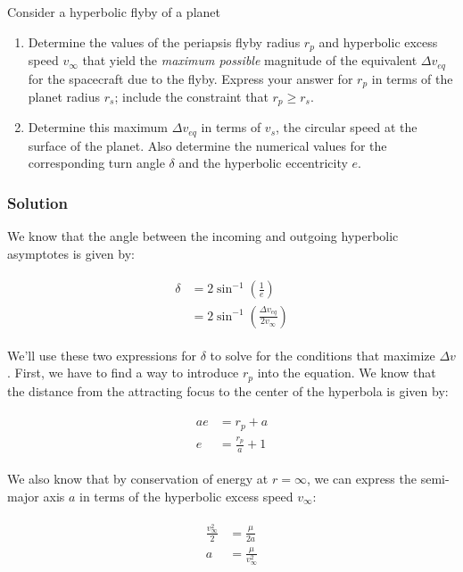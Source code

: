 \documentclass[
]{article}
\providecommand{\tightlist}{%
  \setlength{\itemsep}{0pt}\setlength{\parskip}{0pt}}
\begin{document}
Consider a hyperbolic flyby of a planet

\begin{enumerate}
\tightlist
\item
  Determine the values of the periapsis flyby radius \(r_p\) and
  hyperbolic excess speed \(v_\infty\) that yield the \emph{maximum
  possible} magnitude of the equivalent \(\Delta v_{eq}\) for the
  spacecraft due to the flyby. Express your answer for \(r_p\) in terms
  of the planet radius \(r_s\); include the constraint that
  \(r_p \geq r_s\).
\item
  Determine this maximum \(\Delta v_{eq}\) in terms of \(v_s\), the
  circular speed at the surface of the planet. Also determine the
  numerical values for the corresponding turn angle \(\delta\) and the
  hyperbolic eccentricity \(e\).
\end{enumerate}

\subsubsection{Solution}\label{solution-2}

We know that the angle between the incoming and outgoing hyperbolic
asymptotes is given by:

\[\begin{aligned}
\begin{aligned}
    \delta &= 2 \sin^{-1} \left( \frac{1}{e} \right) \\
    &= 2 \sin^{-1} \left( \frac{\Delta v_{eq}}{2 v_\infty} \right)
\end{aligned}
\end{aligned}\]

We'll use these two expressions for \(\delta\) to solve for the
conditions that maximize \(\Delta v\). First, we have to find a way to
introduce \(r_p\) into the equation. We know that the distance from the
attracting focus to the center of the hyperbola is given by:

\[\begin{aligned}
\begin{aligned}
    ae &= r_p + a \\
    e &= \frac{r_p}{a} + 1
\end{aligned}
\end{aligned}\]

We also know that by conservation of energy at \(r=\infty\), we can
express the semi-major axis \(a\) in terms of the hyperbolic excess
speed \(v_\infty\):

\[\begin{aligned}
\begin{aligned}
    \frac{v_\infty^2}{2} &= \frac{\mu}{2a} \\
    a &= \frac{\mu}{v_\infty^2}
\end{aligned}
\end{aligned}\]
\end{document}
